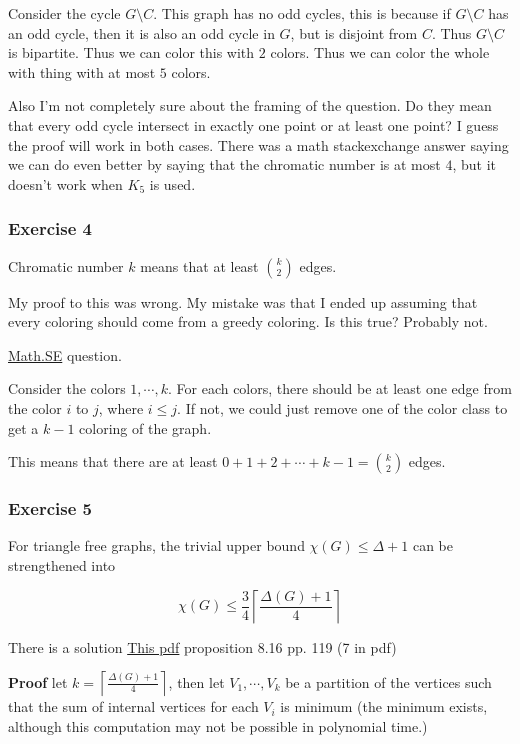 \documentclass[11pt]{article}
\begin{document}
Consider the cycle \(G \setminus C\). This graph has no odd cycles, this is
because if \(G \setminus C\) has an odd cycle, then it is also an odd cycle in
\(G\), but is disjoint from \(C\). Thus \(G \setminus C\) is bipartite. Thus we
can color this with \(2\) colors. Thus we can color the whole with thing with
at most \(5\) colors.

Also I'm not completely sure about the framing of the question. Do they mean
that every odd cycle intersect in exactly one point or at least one point? I
guess the proof will work in both cases. There was a math stackexchange
answer saying we can do even better by saying that the chromatic number is
at most \(4\), but it doesn't work when \(K_5\) is used.
\subsubsection{Exercise 4}
\label{sec:org5413537}
Chromatic number \(k\) means that at least \({k \choose 2}\) edges.

My proof to this was wrong. My mistake was that I ended up assuming that
every coloring should come from a greedy coloring. Is this true? Probably
not.

\href{https://math.stackexchange.com/questions/1135688/prove-that-every-k-chromatic-graph-has-size-m-geq-binom-k2}{Math.SE} question.

Consider the colors \(1, \cdots, k\). For each colors, there should be at
least one edge from the color \(i\) to \(j\), where \(i \le j\). If not, we could
just remove one of the color class to get a \(k-1\) coloring of the graph.

This means that there are at least \(0 + 1 + 2 + \cdots + k - 1 =
    \binom{k}{2}\) edges.
\subsubsection{Exercise 5}
\label{sec:org57f727e}
For triangle free graphs, the trivial upper bound \(\chi(G) \le \Delta + 1\)
can be strengthened into

$$\chi(G) \le \frac{3}{4} \left\lceil \frac{\Delta(G) + 1}{4}\right\rceil$$

There is a solution \href{http://www-sop.inria.fr/members/Frederic.Havet/Cours/coloration.pdf}{This pdf} proposition 8.16 pp. 119 (7 in pdf)

\textbf{Proof} let \(k = \left\lceil \frac{\Delta(G) + 1}{4}\right\rceil\), then let
 \(V_1, \cdots, V_k\) be a partition of the vertices such that the sum of
 internal vertices for each \(V_i\) is minimum (the minimum exists, although
 this computation may not be possible in polynomial time.)
\end{document}
